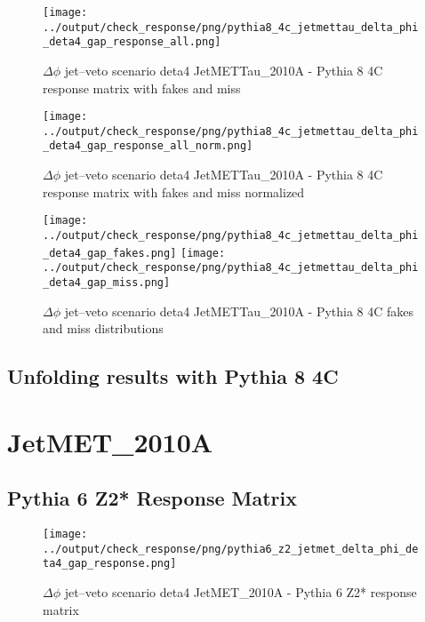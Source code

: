 \documentclass[11pt]{book}
\begin{document}
\begin{figure}[ht]
\centering
\texttt{[image: ../output/check\_response/png/pythia8\_4c\_jetmettau\_delta\_phi\_deta4\_gap\_response\_all.png]}
\caption{$\Delta\phi$ jet--veto scenario deta4 JetMETTau\_2010A - Pythia 8 4C response matrix with fakes and miss}
\label{p8_jetmettau_delta_phi_deta4_gap_response_all}
\end{figure}

\begin{figure}[ht]
\centering
\texttt{[image: ../output/check\_response/png/pythia8\_4c\_jetmettau\_delta\_phi\_deta4\_gap\_response\_all\_norm.png]}
\caption{$\Delta\phi$ jet--veto scenario deta4 JetMETTau\_2010A - Pythia 8 4C response matrix with fakes and miss normalized}
\label{p8_jetmettau_delta_phi_deta4_gap_response_all_norm}
\end{figure}

\begin{figure}[ht]
\centering
\texttt{[image: ../output/check\_response/png/pythia8\_4c\_jetmettau\_delta\_phi\_deta4\_gap\_fakes.png]}
\texttt{[image: ../output/check\_response/png/pythia8\_4c\_jetmettau\_delta\_phi\_deta4\_gap\_miss.png]}
\caption{$\Delta\phi$ jet--veto scenario deta4 JetMETTau\_2010A - Pythia 8 4C fakes and miss distributions}
\label{p8_jetmettau_delta_phi_deta4_gap_fakesmiss}
\end{figure}


\clearpage
\subsection{Unfolding results with Pythia 8 4C}


\section{JetMET\_2010A}
\subsection{Pythia 6 Z2* Response Matrix}

\begin{figure}[ht]
\centering
\texttt{[image: ../output/check\_response/png/pythia6\_z2\_jetmet\_delta\_phi\_deta4\_gap\_response.png]}
\caption{$\Delta\phi$ jet--veto scenario deta4 JetMET\_2010A - Pythia 6 Z2* response matrix}
\label{p6_jetmet_delta_phi_deta4_gap_response}
\end{figure}
\end{document}
